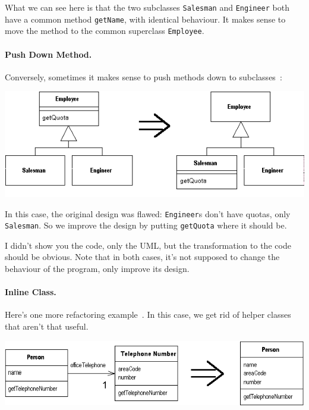 What we can see here is that the two subclasses {\tt Salesman} and
{\tt Engineer} both have a common method {\tt getName}, with
identical behaviour. It makes sense to move the method to the common
superclass {\tt Employee}.

\paragraph{Push Down Method.} Conversely, sometimes it makes sense
to push methods down to subclasses~\cite{ref:pushdown}:

\begin{center}
\includegraphics[width=\textwidth]{images/pushDownMethod.png}
\end{center}

In this case, the original design was flawed: {\tt Engineer}s don't
have quotas, only {\tt Salesman}. So we improve the design by 
putting {\tt getQuota} where it should be.

I didn't show you the code, only the UML, but the transformation to the
code should be obvious. Note that in both cases, it's not supposed
to change the behaviour of the program, only improve its design.

\paragraph{Inline Class.} Here's one more refactoring example~\cite{ref:inline}. In this case, we get
rid of helper classes that aren't that useful.

\begin{center}
\includegraphics[width=\textwidth]{images/inlineClass.png}
\end{center}

